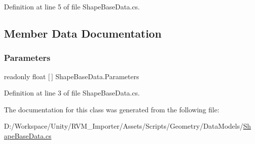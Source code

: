 Definition at line 5 of file Shape\+Base\+Data.\+cs.



\subsection{Member Data Documentation}
\mbox{\label{class_shape_base_data_a263fe301ad336f18484de57a0a7361b0}} 
\subsubsection{\texorpdfstring{Parameters}{Parameters}}
{\footnotesize\ttfamily readonly float \mbox{[}$\,$\mbox{]} Shape\+Base\+Data.\+Parameters}



Definition at line 3 of file Shape\+Base\+Data.\+cs.



The documentation for this class was generated from the following file\+:\begin{DoxyCompactItemize}
\item 
D\+:/\+Workspace/\+Unity/\+R\+V\+M\+\_\+\+Importer/\+Assets/\+Scripts/\+Geometry/\+Data\+Models/\mbox{\hyperlink{_shape_base_data_8cs}{Shape\+Base\+Data.\+cs}}\end{DoxyCompactItemize}
